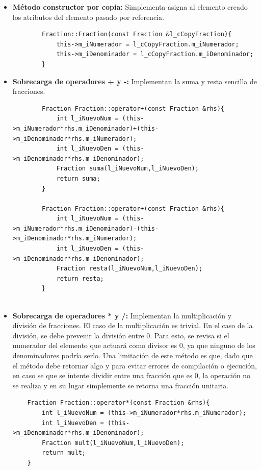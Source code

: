 \begin{itemize}
    \item \textbf{Método constructor por copia:} Simplementa asigna al elemento creado los atributos del elemento pasado por referencia.
        \begin{verbatim}
        Fraction::Fraction(const Fraction &l_cCopyFraction){
            this->m_iNumerador = l_cCopyFraction.m_iNumerador;
            this->m_iDenominador = l_cCopyFraction.m_iDenominador;
        }
        \end{verbatim}
        
    \item \textbf{Sobrecarga de operadores + y -: } Implementan la suma y resta sencilla de fracciones. 
        \begin{verbatim}
        Fraction Fraction::operator+(const Fraction &rhs){
            int l_iNuevoNum = (this->m_iNumerador*rhs.m_iDenominador)+(this->m_iDenominador*rhs.m_iNumerador);
            int l_iNuevoDen = (this->m_iDenominador*rhs.m_iDenominador);
            Fraction suma(l_iNuevoNum,l_iNuevoDen);
            return suma;
        }
        
        Fraction Fraction::operator+(const Fraction &rhs){
            int l_iNuevoNum = (this->m_iNumerador*rhs.m_iDenominador)-(this->m_iDenominador*rhs.m_iNumerador);
            int l_iNuevoDen = (this->m_iDenominador*rhs.m_iDenominador);
            Fraction resta(l_iNuevoNum,l_iNuevoDen);
            return resta;
        }
        
        \end{verbatim}
    \item \textbf{Sobrecarga de operadores * y /: } Implementan la multiplicación y división de fracciones. El caso de la multiplicación es trivial. En el caso de la división, se debe prevenir la división entre 0. Para esto, se revisa si el numerador del elemento que actuará como divisor es 0, ya que ninguno de los denominadores podría serlo. Una limitación de este método es que, dado que el método debe retornar algo y para evitar errores de compilación o ejecución, en caso se que se intente dividir entre una fracción que es 0, la operación no se realiza y en su lugar simplemente se retorna una fracción unitaria.
    
    \begin{verbatim}
    Fraction Fraction::operator*(const Fraction &rhs){
        int l_iNuevoNum = (this->m_iNumerador*rhs.m_iNumerador);
        int l_iNuevoDen = (this->m_iDenominador*rhs.m_iDenominador);
        Fraction mult(l_iNuevoNum,l_iNuevoDen);
        return mult;
    }
    

\end{verbatim}
\end{itemize}
